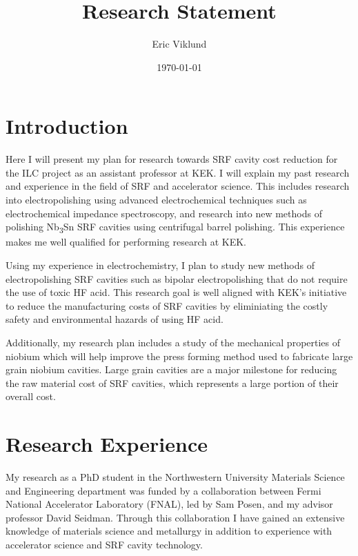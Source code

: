 \documentclass[]{revtex4-2}
\begin{document}
\title{Research Statement}
\author{Eric Viklund}


\date{\today}


\maketitle

\section{Introduction}

    Here I will present my plan for research towards SRF cavity cost reduction for the ILC project as an assistant professor at KEK. I will explain my past research and experience in the field of SRF and accelerator science. This includes research into electropolishing using advanced electrochemical techniques such as electrochemical impedance spectroscopy, and research into new methods of polishing Nb\textsubscript{3}Sn SRF cavities using centrifugal barrel polishing. This experience makes me well qualified for performing research at KEK.

    Using my experience in electrochemistry, I plan to study new methods of electropolishing SRF cavities such as bipolar electropolishing that do not require the use of toxic HF acid. This research goal is well aligned with KEK's initiative to reduce the manufacturing costs of SRF cavities by eliminiating the costly safety and environmental hazards of using HF acid.

    Additionally, my research plan includes a study of the mechanical properties of niobium which will help improve the press forming method used to fabricate large grain niobium cavities. Large grain cavities are a major milestone for reducing the raw material cost of SRF cavities, which represents a large portion of their overall cost.

\section{Research Experience}

    My research as a PhD student in the Northwestern University Materials Science and Engineering department was funded by a collaboration between Fermi National Accelerator Laboratory (FNAL), led by Sam Posen, and my advisor professor David Seidman. Through this collaboration I have gained an extensive knowledge of materials science and metallurgy in addition to experience with accelerator science and SRF cavity technology. 
\end{document}
